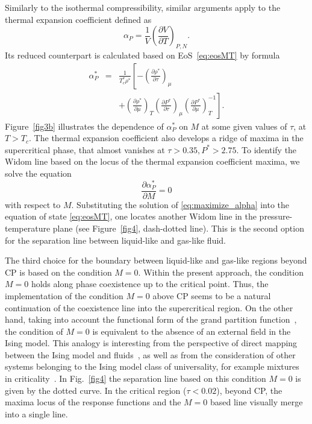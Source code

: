 Similarly to the isothermal compressibility, similar arguments apply to the thermal expansion coefficient defined as
\begin{equation}
	\alpha_{P} = \frac{1}{V} \left(\frac{\partial V}{\partial T}\right)_{P,N}.
\end{equation}
Its reduced counterpart is calculated based on EoS~\eqref{eq:eosMT} by formula
\begin{eqnarray}
	\alpha^*_P & = & \frac{1}{T^*_c \rho^*}
	\left[ 
	-\left(\frac{\partial \rho^*}{\partial \tau}\right)_{\mu}
	\right. \nonumber\\
	&& + \left.\left(\frac{\partial \rho^*}{\partial \mu}\right)_{T}
	\left(\frac{\partial P^*}{\partial \tau}\right)_{\mu}
	\left(\frac{\partial P^*}{\partial \mu}\right)^{-1}_{T} 
	\right].
\end{eqnarray}
Figure~\ref{fig3b} illustrates the dependence of $\alpha^*_{P}$ on $M$ at some given values of $\tau$, at $T>T_c$. The thermal expansion coefficient also develops a ridge of maxima in the supercritical phase, that almost vanishes at $\tau > 0.35, P^*>2.75$.
To identify the Widom line based on the locus of the thermal expansion coefficient maxima, we solve the equation
\begin{equation}\label{eq:maximize_alpha}
	\frac{\partial \alpha_P^*}{\partial M} = 0
\end{equation}
with respect to $M$.
Substituting the solution of \eqref{eq:maximize_alpha} into the equation of state \eqref{eq:eosMT}, one locates another Widom line in the pressure-temperature plane (see Figure~\ref{fig4}, dash-dotted line). This is the second option for the separation line between liquid-like and gas-like fluid.


The third choice for the boundary between liquid-like and gas-like regions beyond CP is based on the condition $M=0$. Within the present approach, the condition $M=0$ holds along phase coexistence up to the critical point. Thus, the implementation of the condition $M=0$ above CP seems to be a natural continuation of the coexistence line into the supercritical region. On the other hand, taking into account the functional form of the grand partition function~\cite{KD16,KR09}, the condition of $M=0$ is equivalent to the absence of an external field in the Ising model. This analogy is interesting from the perspective of direct mapping between the Ising model and fluids~\cite{Kulinskii10jcp,BK11}, as well as from the consideration of other systems belonging to the Ising model class of universality, for example mixtures in criticality~\cite{OBP97,KD20b}. In Fig.~\ref{fig4} the separation line based on this condition $M=0$ is given by the dotted curve. In the critical region ($\tau<0.02$), beyond CP, the maxima locus of the response functions and the $M=0$ based line visually merge into a single line. 


